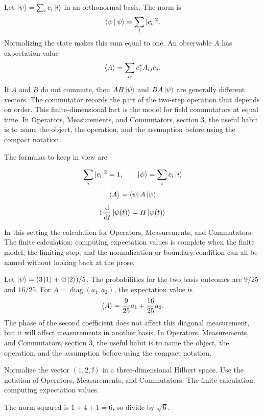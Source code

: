 Let \(\left|\psi\right\rangle=\sum_i c_i\left|i\right\rangle\) in an orthonormal basis.  The norm is
\[
  \left\langle \psi\,\middle|\,\psi\right\rangle=\sum_i |c_i|^2.
\]
Normalizing the state makes this sum equal to one.  An observable \(A\) has expectation value
\[
  \left\langle A\right\rangle=\sum_{ij}c_i^*A_{ij}c_j.
\]
If \(A\) and \(B\) do not commute, then \(AB\left|\psi\right\rangle\) and \(BA\left|\psi\right\rangle\) are generally different vectors.  The commutator records the part of the two-step operation that depends on order.  This finite-dimensional fact is the model for field commutators at equal time.  In Operators, Measurements, and Commutators, section 3, the useful habit is to name the object, the operation, and the assumption before using the compact notation.

The formulas to keep in view are

\[
  \sum_i |c_i|^2=1,\qquad \left|\psi\right\rangle=\sum_i c_i\left|i\right\rangle
\]
\[
  \left\langle A\right\rangle=\left\langle \psi\right|A\left|\psi\right\rangle
\]
\[
  \mathrm i\frac{\,\mathrm d}{\,\mathrm d t}\left|\psi(t)\right\rangle=H\left|\psi(t)\right\rangle
\]

In this setting the calculation for Operators, Measurements, and Commutators: The finite calculation: computing expectation values is complete when the finite model, the limiting step, and the normalization or boundary condition can all be named without looking back at the prose.




\begin{example}
Let \(\left|\psi\right\rangle=(3\left|1\right\rangle+4\mathrm i\left|2\right\rangle)/5\).  The probabilities for the two basis outcomes are \(9/25\) and \(16/25\).  For \(A=\operatorname{diag}(a_1,a_2)\), the expectation value is
\[
  \left\langle A\right\rangle=\frac{9}{25}a_1+\frac{16}{25}a_2.
\]
The phase of the second coefficient does not affect this diagonal measurement, but it will affect measurements in another basis.  In Operators, Measurements, and Commutators, section 3, the useful habit is to name the object, the operation, and the assumption before using the compact notation.
\end{example}



\begin{exercise}
Normalize the vector \((1,2,\ii)\) in a three-dimensional Hilbert space.  Use the notation of Operators, Measurements, and Commutators: The finite calculation: computing expectation values.
\begin{answer}
The norm squared is \(1+4+1=6\), so divide by \(\sqrt6\).
\end{answer}
\end{exercise}

